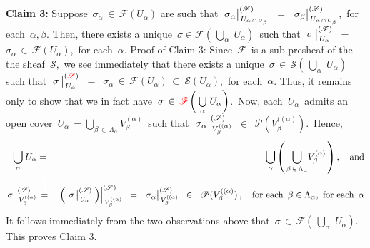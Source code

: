 \vskip 0.5cm
\noindent
\textbf{Claim 3:}\;\;
Suppose \,$\sigma_{\alpha} \,\in\, \mathscr{F}(U_{\alpha})$ are such that
\,$\left.\overset{{\color{white}.}}{\sigma}_{\alpha}\right\vert^{(\mathscr{F})}_{\,U_{\alpha\,\cap\,U_{\beta}}}$
\,$=$\,
$\left.\overset{{\color{white}.}}{\sigma}_{\beta}\right\vert^{(\mathscr{F})}_{\,U_{\alpha\,\cap\,U_{\beta}}}$,\,
for each \,$\alpha, \beta$.
Then, there exists a unique
\,$\sigma \in \mathscr{F}\!\left(\,\underset{\alpha}{\bigcup}\;U_{\alpha}\right)$\,
such that
\,$\left.\overset{{\color{white}.}}{\sigma}\,\right\vert^{(\mathscr{F})}_{\,U_{\alpha}}$
\,$=$\,
$\sigma_{\alpha} \,\in\, \mathscr{F}(U_{\alpha})$,\,
for each \,$\alpha$.
\vskip 0.3cm
\noindent
Proof of Claim 3:\;\;
Since \,$\mathscr{F}$\, is a sub-presheaf of the the sheaf \,$\mathscr{S}$,\,
we see immediately that there exists a unique
\,$\sigma \,\in\, \mathscr{S}\!\left(\,\underset{\alpha}{\bigcup}\;U_{\alpha}\right)$\,
such that
\,$\left.\overset{{\color{white}.}}{\sigma}\,\right\vert^{({\color{red}\mathscr{S}})}_{\,U_{\alpha}}$
\,$=$\,
$\sigma_{\alpha} \,\in\, \mathscr{F}(U_{\alpha}) \,\subset\, \mathscr{S}(U_{\alpha})$,\, for each \,$\alpha$.
Thus, it remains only to show that we in fact have
\,$\sigma \,\in\, {\color{red}\mathscr{F}}\!\left(\,\underset{\alpha}{\bigcup}\;U_{\alpha}\right)$.\,
Now, each \,$U_{\alpha}$\,
admits an open cover
\,$U_{\alpha} \,= \underset{\beta\,\in\,\Lambda_{\alpha}}{\bigcup}V^{(\alpha)}_{\beta}$\,
such that
\,$\left.\overset{{\color{white}.}}{\sigma}_{\alpha}\right\vert^{(\mathscr{S})}_{\,V^{((\alpha)}_{\beta}}$
\,$\in$\, $\mathscr{P}(V^{((\alpha)}_{\beta})$.\,
Hence,
\begin{eqnarray*}
\underset{\alpha}{\bigcup}\;U_{\alpha}
& = &
	\underset{\alpha}{\bigcup}\left(\,\underset{\beta\,\in\,\Lambda_{\alpha}}{\bigcup}V^{(\alpha)}_{\beta}\,\right),
	\quad\textnormal{and}
\\
\left.\overset{{\color{white}.}}{\sigma}\,\right\vert^{(\mathscr{S})}_{\,V^{((\alpha)}_{\beta}}
& \overset{{\color{white}\textnormal{\Huge$1$}}}{=} &
	\left.
		\left(\;
			\left.\overset{{\color{white}.}}{\sigma}\,\right\vert^{(\mathscr{S})}_{\,U_{\alpha}}
			\;\right)
		\right\vert^{(\mathscr{S})}_{\,V^{((\alpha)}_{\beta}}
\;\; = \;\;
	\left.\overset{{\color{white}.}}{\sigma}_{\alpha}\right\vert^{(\mathscr{S})}_{\,V^{((\alpha)}_{\beta}}
\;\; \in \;\;
	\mathscr{P}(V^{((\alpha)}_{\beta})\,,
\quad\textnormal{for each \,$\beta \in \Lambda_{\alpha}$,\, for each \,$\alpha$}
\end{eqnarray*}
It follows immediately from the two observations above that
\,$\sigma \,\in\, \mathscr{F}\!\left(\,\underset{\alpha}{\bigcup}\;U_{\alpha}\right)$.\,
This proves Claim 3.

